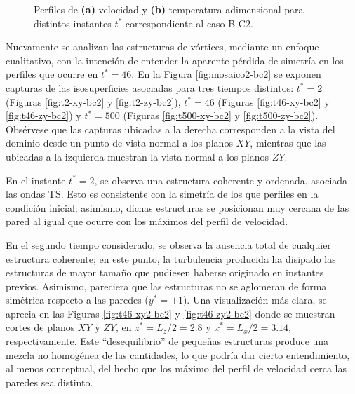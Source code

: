 \begin{figure}[H]
  \centering  
  
  \caption{Perfiles de \textbf{(a)} velocidad y \textbf{(b)} temperatura adimensional para distintos instantes $t^*$ correspondiente al caso B-C2.}
    \label{fig:mosaico-bc2}
\end{figure}


Nuevamente se analizan las estructuras de vórtices, mediante un enfoque cualitativo, con la intención de entender la aparente pérdida de simetría en los perfiles que ocurre en $t^* = 46$. En la Figura \ref{fig:mosaico2-bc2} se exponen capturas de las isosuperficies asociadas para tres tiempos distintos: $t^* = 2$ (Figuras \ref{fig:t2-xy-bc2} y  \ref{fig:t2-zy-bc2}),  $t^* = 46$  (Figuras \ref{fig:t46-xy-bc2} y \ref{fig:t46-zy-bc2}) y  $t^* = 500$  (Figuras \ref{fig:t500-xy-bc2} y \ref{fig:t500-zy-bc2}). Obsérvese que las capturas ubicadas a la derecha corresponden a la vista del dominio desde un punto de vista normal a los planos $XY$, mientras que las ubicadas a la izquierda muestran la vista normal a los planos $ZY$.

En el instante $t^* = 2$, se observa una estructura coherente y ordenada, asociada las ondas TS. Esto es consistente con la simetría de los que perfiles en la condición inicial; asimismo, dichas estructuras se posicionan muy cercana de las pared al igual que ocurre con los máximos del perfil de velocidad.

En el segundo tiempo considerado, se observa la ausencia total de cualquier estructura coherente; en este punto, la turbulencia producida ha disipado las estructuras de mayor tamaño que pudiesen haberse originado en instantes previos. Asimismo, pareciera que las estructuras no se aglomeran de forma simétrica respecto a las paredes ($y^*=\pm 1$). Una visualización más clara, se aprecia en las Figuras \ref{fig:t46-xy2-bc2} y \ref{fig:t46-zy2-bc2} donde se muestran cortes de planos $XY$ y $ZY$, en $z^* = L_z/2 = 2\text{.}8$ y $x^* = L_x / 2 = 3\text{.}14$, respectivamente. Este ``desequilibrio'' de pequeñas estructuras produce una mezcla no homogénea de las cantidades, lo que podría dar cierto entendimiento, al menos conceptual, del hecho que los máximo del perfil de velocidad cerca las paredes sea distinto.   

